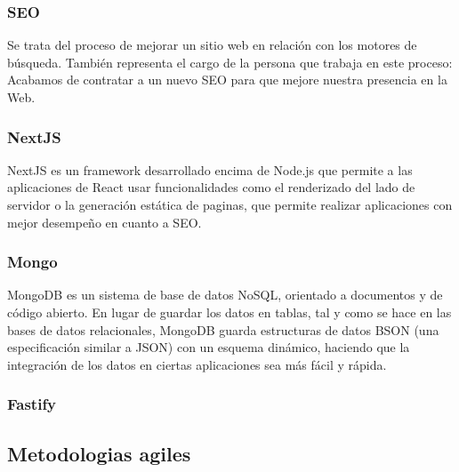     \subsubsection{SEO}
    
        Se trata del proceso de mejorar un sitio web en relación con los motores de búsqueda. También representa el cargo de la persona que trabaja en este proceso: Acabamos de contratar a un nuevo SEO para que mejore nuestra presencia en la Web.

    \subsubsection{NextJS}

        NextJS es un framework desarrollado encima de Node.js que permite a las aplicaciones de React usar funcionalidades como el renderizado del lado de servidor o la generación estática de paginas, que permite realizar aplicaciones con mejor desempeño en cuanto a SEO.


    \subsubsection{Mongo}

        MongoDB es un sistema de base de datos NoSQL, orientado a documentos y de código abierto. En lugar de guardar los datos en tablas, tal y como se hace en las bases de datos relacionales, MongoDB guarda estructuras de datos BSON (una especificación similar a JSON) con un esquema dinámico, haciendo que la integración de los datos en ciertas aplicaciones sea más fácil y rápida.

        \iffalse 
            \begin{figure}
                \texttt{[image: mongodb-structure.jpg]}
                \caption{Comparación de estructura de datos entre MongoDB y los RDBMS (sistema de gestión de bases de datos relacionales)}
            \end{figure}
        \fi

    \subsubsection{Fastify}



\subsection{Metodologias agiles}


